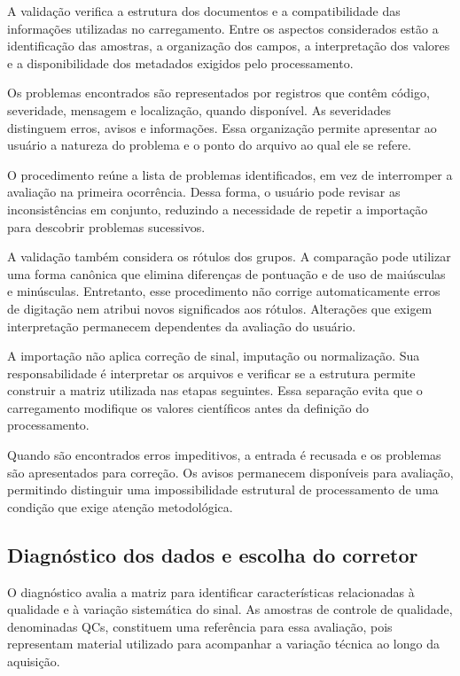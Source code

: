 A validação verifica a estrutura dos documentos e a compatibilidade das informações utilizadas no carregamento. Entre os aspectos considerados estão a identificação das amostras, a organização dos campos, a interpretação dos valores e a disponibilidade dos metadados exigidos pelo processamento.

Os problemas encontrados são representados por registros que contêm código, severidade, mensagem e localização, quando disponível. As severidades distinguem erros, avisos e informações. Essa organização permite apresentar ao usuário a natureza do problema e o ponto do arquivo ao qual ele se refere.

O procedimento reúne a lista de problemas identificados, em vez de interromper a avaliação na primeira ocorrência. Dessa forma, o usuário pode revisar as inconsistências em conjunto, reduzindo a necessidade de repetir a importação para descobrir problemas sucessivos.

A validação também considera os rótulos dos grupos. A comparação pode utilizar uma forma canônica que elimina diferenças de pontuação e de uso de maiúsculas e minúsculas. Entretanto, esse procedimento não corrige automaticamente erros de digitação nem atribui novos significados aos rótulos. Alterações que exigem interpretação permanecem dependentes da avaliação do usuário.

A importação não aplica correção de sinal, imputação ou normalização. Sua responsabilidade é interpretar os arquivos e verificar se a estrutura permite construir a matriz utilizada nas etapas seguintes. Essa separação evita que o carregamento modifique os valores científicos antes da definição do processamento.

Quando são encontrados erros impeditivos, a entrada é recusada e os problemas são apresentados para correção. Os avisos permanecem disponíveis para avaliação, permitindo distinguir uma impossibilidade estrutural de processamento de uma condição que exige atenção metodológica.

\subsection{Diagnóstico dos dados e escolha do corretor}
\label{subsec:diagnostico-escolha-corretor}

O diagnóstico avalia a matriz para identificar características relacionadas à qualidade e à variação sistemática do sinal. As amostras de controle de qualidade, denominadas QCs, constituem uma referência para essa avaliação, pois representam material utilizado para acompanhar a variação técnica ao longo da aquisição.

